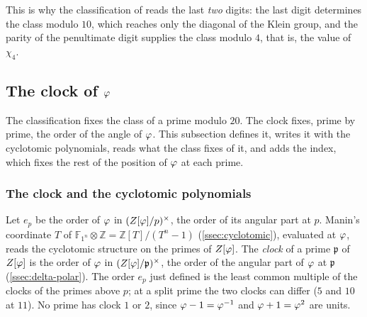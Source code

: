 This is why the classification of \cite{grisales25} reads the last \emph{two} digits:
the last digit determines the class modulo $10$, which reaches only the diagonal of the
Klein group, and the parity of the penultimate digit supplies the class modulo $4$, that
is, the value of $\chi_4$.

\subsection{The clock of $\varphi$}\label{sec:clock}

The classification fixes the class of a prime modulo $20$.  The clock fixes, prime by prime, the order of
the angle of $\varphi$.  This subsection defines it, writes it with the cyclotomic polynomials, reads what the
class fixes of it, and adds the index, which fixes the rest of the position of $\varphi$ at each prime.

\subsubsection{The clock and the cyclotomic polynomials}\label{ssec:clock-cyclotomic}

Let $e_p$ be the order of $\varphi$ in $(Z[\varphi]/p)^\times$, the order of its angular part at $p$.
Manin's coordinate $T$ of $\mathbb{F}_{1^n}\otimes\mathbb{Z}=\mathbb{Z}[T]/(T^n-1)$
(\cref{ssec:cyclotomic}), evaluated at $\varphi$, reads the cyclotomic structure on the primes of $Z[\varphi]$.
The \emph{clock} of a prime $\mathfrak p$ of $Z[\varphi]$ is the order of $\varphi$ in
$(Z[\varphi]/\mathfrak p)^\times$, the order of the angular part of $\varphi$ at
$\mathfrak p$ (\cref{ssec:delta-polar}).  The order $e_p$ just defined
is the least common multiple of the clocks of the primes above $p$; at a split prime
the two clocks can differ ($5$ and $10$ at $11$).  No prime has clock $1$ or $2$, since
$\varphi-1=\varphi^{-1}$ and $\varphi+1=\varphi^2$ are units.

